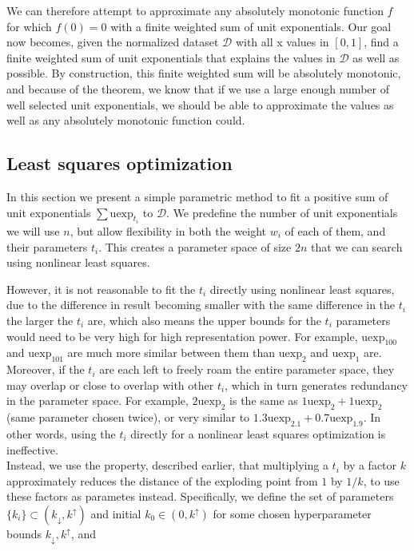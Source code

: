 \documentclass[12pt,a4paper]{article}
\newcommand{\uexp}[1] {{\text{uexp}_{#1}}}
\begin{document}
We can therefore attempt to approximate any absolutely monotonic function $f$ for which $f(0) = 0$ with a finite weighted sum of unit exponentials. Our goal now becomes, given the normalized dataset $\mathcal{D}$ with all x values in $[0,1]$, find a finite weighted sum of unit exponentials that explains the values in $\mathcal{D}$ as well as possible. By construction, this finite weighted sum will be absolutely monotonic, and because of the theorem, we know that if we use a large enough number of well selected unit exponentials, we should be able to approximate the values as well as any absolutely monotonic function could.

\subsection{Least squares optimization}
\label{least_squares}

In this section we present a simple parametric method to fit a positive sum of unit exponentials $\sum \uexp{t_i}$ to $\mathcal{D}$. We predefine the number of unit exponentials we will use $n$, but allow flexibility in both the weight $w_i$ of each of them, and their parameters $t_i$. This creates a parameter space of size $2n$ that we can search using nonlinear least squares.

However, it is not reasonable to fit the $t_i$ directly using nonlinear least squares, due to the difference in result becoming smaller with the same difference in the $t_i$ the larger the $t_i$ are, which also means the upper bounds for the $t_i$ parameters would need to be very high for high representation power. For example, $\uexp{100}$ and $\uexp{101}$ are much more similar between them than $\uexp{2}$ and $\uexp{1}$ are. Moreover, if the $t_i$ are each left to freely roam the entire parameter space, they may overlap or close to overlap with other $t_i$, which in turn generates redundancy in the parameter space. For example, $2 \uexp{2}$ is the same as $1 \uexp{2} + 1 \uexp{2}$ (same parameter chosen twice), or very similar to $1.3 \uexp{2.1} + 0.7 \uexp{1.9}$. In other words, using the $t_i$ directly for a nonlinear least squares optimization is ineffective.\\

Instead, we use the property, described earlier, that multiplying a $t_i$ by a factor $k$ approximately reduces the distance of the exploding point from $1$ by $1/k$, to use these factors as parametes instead. Specifically, we define the set of parameters $\{k_i\} \subset (k_{\downarrow},k^{\uparrow})$ and initial $k_0 \in (0,k^{\uparrow})$ for some chosen hyperparameter bounds $k_{\downarrow}, k^{\uparrow}$, and
\end{document}
